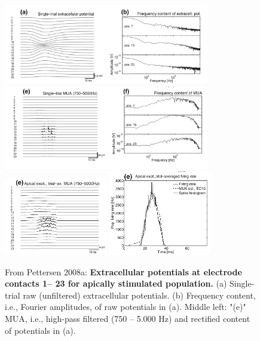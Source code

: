 \begin{figure}[!ht]
\begin{center}
\includegraphics[width=0.8\textwidth]{Figures/Spikes/MUA-3} \\
\includegraphics[width=0.8\textwidth]{Figures/Spikes/MUA-4} \\
\includegraphics[width=0.4\textwidth]{Figures/Spikes/MUA-5} 
\includegraphics[width=0.4\textwidth]{Figures/Spikes/MUA-7} 
\end{center}
\caption[]{
From Pettersen 2008a: \textbf{Extracellular potentials at electrode contacts 1-- 23 for apically stimulated population.} 
(a) Single-trial raw (unfiltered) extracellular potentials. 
(b) Frequency content, i.e., Fourier amplitudes, of raw potentials in (a). 
Middle left: "(e)" MUA, i.e., high-pass filtered (750 -- 5.000 Hz) and rectified content of potentials in (a). 
}
\end{figure}
